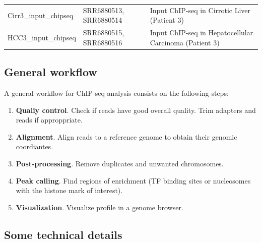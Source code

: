 \documentclass[]{article}
\providecommand{\tightlist}{%
  \setlength{\itemsep}{0pt}\setlength{\parskip}{0pt}}
\begin{document}
\begin{longtable}[]{@{}lll@{}}
\begin{minipage}[t]{0.32\columnwidth}\raggedright\strut
Cirr3\_input\_chipseq\strut
\end{minipage} & \begin{minipage}[t]{0.27\columnwidth}\raggedright\strut
SRR6880513, SRR6880514\strut
\end{minipage} & \begin{minipage}[t]{0.32\columnwidth}\raggedright\strut
Input ChIP-seq in Cirrotic Liver (Patient 3)\strut
\end{minipage}\tabularnewline
\begin{minipage}[t]{0.32\columnwidth}\raggedright\strut
HCC3\_input\_chipseq\strut
\end{minipage} & \begin{minipage}[t]{0.27\columnwidth}\raggedright\strut
SRR6880515, SRR6880516\strut
\end{minipage} & \begin{minipage}[t]{0.32\columnwidth}\raggedright\strut
Input ChIP-seq in Hepatocellular Carcinoma (Patient 3)\strut
\end{minipage}\tabularnewline
\bottomrule
\end{longtable}

\subsection{General workflow}\label{general-workflow}

A general workflow for ChIP-seq analysis consists on the following
steps:

\begin{enumerate}
\def\labelenumi{\arabic{enumi}.}
\tightlist
\item
  \textbf{Qualiy control}. Check if reads have good overall quality.
  Trim adapters and reads if approppriate.
\item
  \textbf{Alignment}. Align reads to a reference genome to obtain their
  genomic coordiantes.
\item
  \textbf{Post-processing}. Remove duplicates and unwanted chromosomes.
\item
  \textbf{Peak calling}. Find regions of enrichment (TF binding sites or
  nucleosomes with the histone mark of interest).
\item
  \textbf{Visualization}. Visualize profile in a genome browser.
\end{enumerate}

\subsection{Some technical details}\label{some-technical-details}
\end{document}

